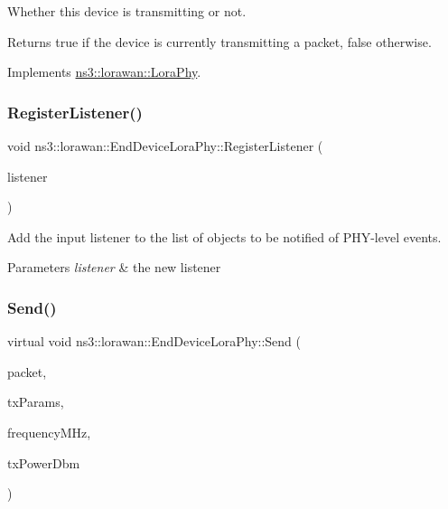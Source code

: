 Whether this device is transmitting or not.

\begin{DoxyReturn}{Returns}
true if the device is currently transmitting a packet, false otherwise. 
\end{DoxyReturn}


Implements \hyperlink{classns3_1_1lorawan_1_1LoraPhy_a5280764d934ba5ff8d305b0bc6b600ce}{ns3\+::lorawan\+::\+Lora\+Phy}.

\mbox{\label{classns3_1_1lorawan_1_1EndDeviceLoraPhy_a7e7c08dc5d7926c5210e121c3dd2bfe9}} 
\subsubsection{\texorpdfstring{Register\+Listener()}{RegisterListener()}}
{\footnotesize\ttfamily void ns3\+::lorawan\+::\+End\+Device\+Lora\+Phy\+::\+Register\+Listener (\begin{DoxyParamCaption}\item[{\hyperlink{classns3_1_1lorawan_1_1EndDeviceLoraPhyListener}{End\+Device\+Lora\+Phy\+Listener} $\ast$}]{listener }\end{DoxyParamCaption})}

Add the input listener to the list of objects to be notified of P\+H\+Y-\/level events.


\begin{DoxyParams}{Parameters}
{\em listener} & the new listener \\
\hline
\end{DoxyParams}
\mbox{\label{classns3_1_1lorawan_1_1EndDeviceLoraPhy_a47136bcb9a933e69dbf0872fbd667610}} 
\subsubsection{\texorpdfstring{Send()}{Send()}}
{\footnotesize\ttfamily virtual void ns3\+::lorawan\+::\+End\+Device\+Lora\+Phy\+::\+Send (\begin{DoxyParamCaption}\item[{Ptr$<$ Packet $>$}]{packet,  }\item[{\hyperlink{structns3_1_1lorawan_1_1LoraTxParameters}{Lora\+Tx\+Parameters}}]{tx\+Params,  }\item[{double}]{frequency\+M\+Hz,  }\item[{double}]{tx\+Power\+Dbm }\end{DoxyParamCaption})\hspace{0.3cm}{\ttfamily [pure virtual]}}

